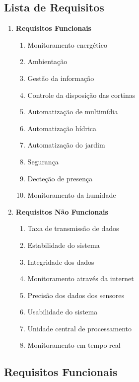\subsection{Lista de Requisitos}
\begin{enumerate} %
	\item \textbf{Requisitos Funcionais}
	\begin{enumerate} %
		\item Monitoramento energético
		\item Ambientação
		\item Gestão da informação
		\item Controle da disposição das cortinas
		\item Automatização de multimídia
		\item Automatização hídrica
		\item Automatização do jardim
		\item Segurança
		\item Decteção de presença
		\item Monitoramento da humidade
	\end{enumerate}

	\item \textbf{Requisitos Não Funcionais}
	\begin{enumerate} %
		\item Taxa de transmissão de dados
		\item Estabilidade do sistema
		\item Integridade dos dados
		\item Monitoramento através da internet
		\item Precisão dos dados dos sensores
		\item Usabilidade do sistema
		\item Unidade central de processamento
		\item Monitoramento em tempo real
	\end{enumerate}
\end{enumerate}

\subsection{Requisitos Funcionais}
